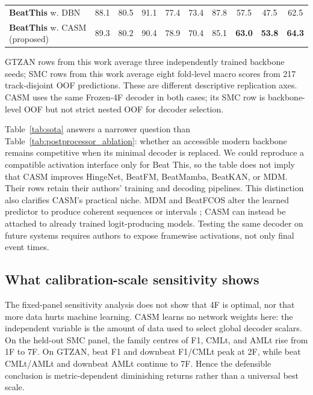 \documentclass{article}
\begin{document}
\begin{table}[t]
{\begin{tabular}{l|ccc|ccc|ccc}
\rowcolor{gray!10}
\textbf{BeatThis} w. DBN
& 88.1 & 80.5 & 91.1
& 77.4 & 73.4 & 87.8
& 57.5 & 47.5 & 62.5 \\
\textbf{BeatThis} w. CASM (proposed)
& 89.3 & 80.2 & 90.4
& 78.9 & 70.4 & 85.1
& \textbf{63.0} & \textbf{53.8} & \textbf{64.3} \\
\bottomrule
\end{tabular}%
}
\vspace{2pt}
\begin{minipage}{0.99\textwidth}
\footnotesize
GTZAN rows from this work average three independently trained backbone seeds;
SMC rows from this work average eight fold-level macro scores from 217
track-disjoint OOF predictions. These are different descriptive replication
axes. CASM uses the same Frozen-4F decoder in both cases; its SMC row is
backbone-level OOF but not strict nested OOF for decoder selection.
\end{minipage}
\endgroup
\end{table}

Table~\ref{tab:sota} answers a narrower question than
Table~\ref{tab:postprocessor_ablation}: whether an accessible modern backbone
remains competitive when its minimal decoder is replaced. We could reproduce
a compatible activation interface only for Beat This, so the table does not
imply that CASM improves HingeNet, BeatFM, BeatMamba, BeatKAN, or MDM. Their
rows retain their authors' training and decoding pipelines. This distinction
also clarifies CASM's practical niche. MDM and BeatFCOS alter the learned
predictor to produce coherent sequences or intervals
\cite{foscarin2026masked,ahn2025beatfcos}; CASM can instead be attached to
already trained logit-producing models. Testing the same decoder on future
systems requires authors to expose framewise activations, not only final event
times.

\subsection{What calibration-scale sensitivity shows}

The fixed-panel sensitivity analysis does not show that 4F is optimal, nor
that more data hurts machine learning. CASM learns no network weights here:
the independent variable is the amount of data used to select global decoder
scalars. On the held-out SMC panel, the family centres of F1, CMLt, and AMLt
rise from 1F to 7F. On GTZAN, beat F1 and downbeat F1/CMLt peak at 2F, while
beat CMLt/AMLt and downbeat AMLt continue to 7F. Hence the defensible
conclusion is metric-dependent diminishing returns rather than a universal
best scale.
\end{document}
